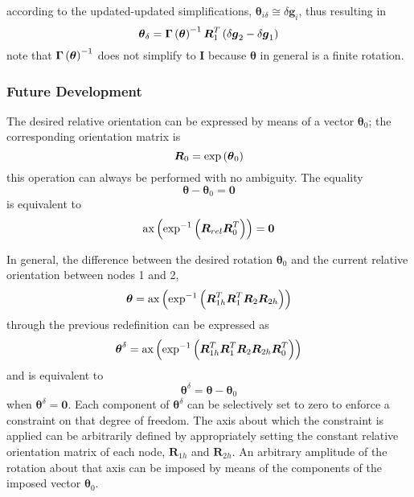 \documentclass[10pt,dvips,fleqn]{report}
\newcommand{\T}[1]{\boldsymbol{#1}}
\begin{document}
according to the updated-updated simplifications,
$\T{\theta}_{i\delta}\cong\delta\T{g}_i$, thus resulting in
\begin{equation}
	\T{\theta}_{\delta} = \T{\Gamma}\plbr{\T{\theta}}^{-1} \T{R}_1^T \plbr{
		\delta\T{g}_2 - \delta\T{g}_1
	}
	\label{eq:DRIVE-HINGE-theta-delta}
\end{equation}
note that $\T{\Gamma}\plbr{\T{\theta}}^{-1}$ does not simplify to $\T{I}$
because $\T{\theta}$ in general is a finite rotation.





\subsubsection{Future Development}
The desired relative orientation can be expressed by means of a vector 
$\T{\theta}_0$; the corresponding orientation matrix is
\begin{equation}
	\T{R}_0 = \exp\plbr{\T{\theta}_0}
\end{equation}
this operation can always be performed with no ambiguity.
The equality
\begin{equation}
	\T{\theta} - \T{\theta}_0 = \T{0}
\end{equation}
is equivalent to
\begin{equation}
	\llk{ax}\plbr{\exp^{-1}\plbr{\T{R}_{rel} \T{R}_0^T}} = \T{0}
\end{equation}

\noindent
In general, the difference between the desired rotation
$\T{\theta}_0$ and the current relative orientation between
nodes 1 and 2,
\begin{equation}
	\T{\theta} = \llk{ax}\plbr{\exp^{-1}\plbr{
		\T{R}_{1h}^T \T{R}_1^T \T{R}_2 \T{R}_{2h}
	}}
\end{equation}
through the previous redefinition can be expressed as
\begin{equation}
	\T{\theta}^{\delta} = \llk{ax}\plbr{\exp^{-1}\plbr{
		\T{R}_{1h}^T \T{R}_1^T \T{R}_2 \T{R}_{2h} \T{R}_0^T
	}}
\end{equation}
and is equivalent to
\begin{equation}
	\T{\theta}^{\delta} = \T{\theta} - \T{\theta}_0
\end{equation}
when $\T{\theta}^{\delta}=\T{0}$.
Each component of $\T{\theta}^{\delta}$ can be selectively set
to zero to enforce a constraint on that degree of freedom.
The axis about which the constraint is applied can be arbitrarily 
defined by appropriately setting the constant relative orientation
matrix of each node, $\T{R}_{1h}$ and $\T{R}_{2h}$.
An arbitrary amplitude of the rotation about that axis can be imposed
by means of the components of the imposed vector $\T{\theta}_0$.
\end{document}
